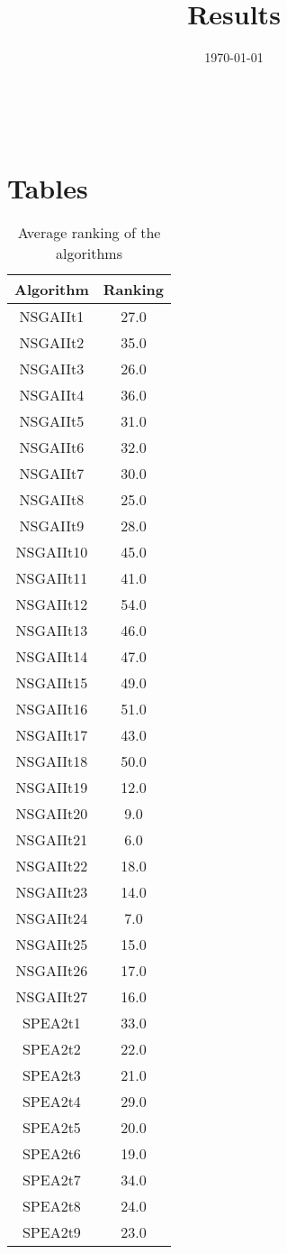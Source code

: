 \documentclass{article}
\title{Results}
\author{}
\date{\today}
\begin{document}
\oddsidemargin 0in \topmargin 0in\maketitle
\
\section{Tables}
\begin{table}[!htp]
\centering
\caption{Average ranking of the algorithms}
\begin{tabular}{c|c}
Algorithm&Ranking\\
\hline
NSGAIIt1&27.0\\
NSGAIIt2&35.0\\
NSGAIIt3&26.0\\
NSGAIIt4&36.0\\
NSGAIIt5&31.0\\
NSGAIIt6&32.0\\
NSGAIIt7&30.0\\
NSGAIIt8&25.0\\
NSGAIIt9&28.0\\
NSGAIIt10&45.0\\
NSGAIIt11&41.0\\
NSGAIIt12&54.0\\
NSGAIIt13&46.0\\
NSGAIIt14&47.0\\
NSGAIIt15&49.0\\
NSGAIIt16&51.0\\
NSGAIIt17&43.0\\
NSGAIIt18&50.0\\
NSGAIIt19&12.0\\
NSGAIIt20&9.0\\
NSGAIIt21&6.0\\
NSGAIIt22&18.0\\
NSGAIIt23&14.0\\
NSGAIIt24&7.0\\
NSGAIIt25&15.0\\
NSGAIIt26&17.0\\
NSGAIIt27&16.0\\
SPEA2t1&33.0\\
SPEA2t2&22.0\\
SPEA2t3&21.0\\
SPEA2t4&29.0\\
SPEA2t5&20.0\\
SPEA2t6&19.0\\
SPEA2t7&34.0\\
SPEA2t8&24.0\\
SPEA2t9&23.0\\

\end{tabular}
\end{table}
\end{document}
